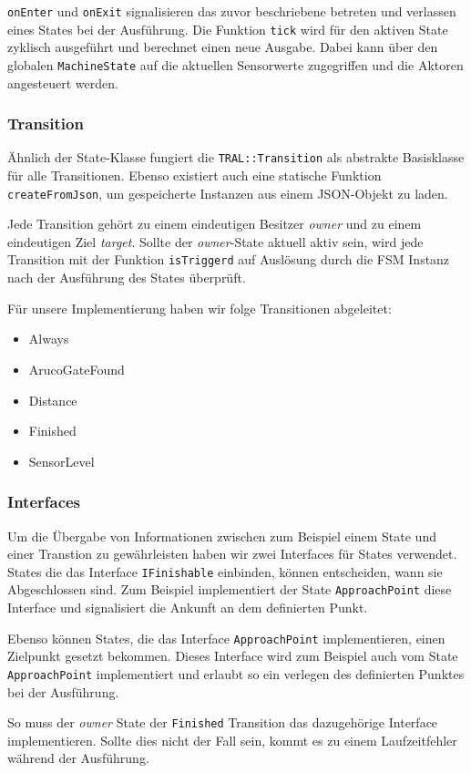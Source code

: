 \texttt{onEnter} und \texttt{onExit} signalisieren das zuvor beschriebene betreten und verlassen eines States bei der Ausführung. Die Funktion \texttt{tick} wird für den aktiven State zyklisch ausgeführt und berechnet einen neue Ausgabe. Dabei kann über den globalen \texttt{MachineState} auf die aktuellen Sensorwerte zugegriffen und die Aktoren angesteuert werden.


\subsubsection{Transition}
Ähnlich der State-Klasse fungiert die \texttt{TRAL::Transition} als abstrakte Basisklasse für alle Transitionen. Ebenso existiert auch eine statische Funktion \texttt{createFromJson}, um gespeicherte Instanzen aus einem JSON-Objekt zu laden. 

Jede Transition gehört zu einem eindeutigen Besitzer \textit{owner} und zu einem eindeutigen Ziel \textit{target}. Sollte der \textit{owner}-State aktuell aktiv sein, wird jede Transition mit der Funktion \texttt{isTriggerd} auf Auslösung durch die FSM Instanz nach der Ausführung des States überprüft.

Für unsere Implementierung haben wir folge Transitionen abgeleitet:

\begin{itemize}
	\item Always
	\item ArucoGateFound
	\item Distance
	\item Finished
	\item SensorLevel
\end{itemize}

\subsubsection{Interfaces}

Um die Übergabe von Informationen zwischen zum Beispiel einem State und einer Transtion zu gewährleisten haben wir zwei Interfaces für States verwendet. 
States die das Interface \texttt{IFinishable} einbinden, können entscheiden, wann sie Abgeschlossen sind. Zum Beispiel implementiert der State \texttt{ApproachPoint} diese Interface und signalisiert die Ankunft an dem definierten Punkt.

Ebenso können States, die das Interface \texttt{ApproachPoint} implementieren, einen Zielpunkt gesetzt bekommen. Dieses Interface wird zum Beispiel auch vom State \texttt{ApproachPoint} implementiert und erlaubt so ein verlegen des definierten Punktes bei der Ausführung.

So muss der \textit{owner} State der \texttt{Finished} Transition das dazugehörige Interface implementieren. Sollte dies nicht der Fall sein, kommt es zu einem Laufzeitfehler während der Ausführung.
